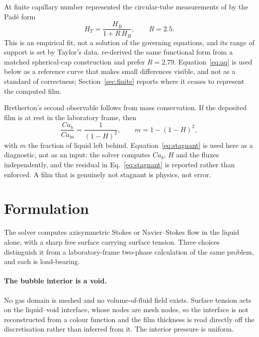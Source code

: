\documentclass[11pt,a4paper]{article}
\begin{document}
At finite capillary number \citet{aussillous2000quick} represented the
circular-tube measurements of \citet{taylor1961deposition} by the Pad\'e form
\begin{equation}
  H_T=\frac{H_B}{1+R\,H_B},\qquad R=2.5.
  \label{eq:aq}
\end{equation}
This is an empirical fit, not a solution of the governing equations, and its
range of support is set by Taylor's data. \citet{klaseboer2014extended}
re-derived the same functional form from a matched spherical-cap construction
and prefer $R=2.79$. Equation~\eqref{eq:aq} is used below as a reference curve
that makes small differences visible, and not as a standard of correctness;
Section~\ref{sec:finite} reports where it ceases to represent the computed film.

Bretherton's second observable follows from mass conservation. If the deposited
film is at rest in the laboratory frame, then
\begin{equation}
  \frac{Ca_b}{Ca_{\mathrm{in}}}=\frac{1}{(1-H)^2},
  \qquad m=1-(1-H)^2,
  \label{eq:stagnant}
\end{equation}
with $m$ the fraction of liquid left behind. Equation~\eqref{eq:stagnant} is
used here as a diagnostic, not as an input: the solver computes $Ca_b$, $H$ and
the fluxes independently, and the residual in Eq.~\eqref{eq:stagnant} is
reported rather than enforced. A film that is genuinely not stagnant is
physics, not error.

\section{Formulation}

The solver computes axisymmetric Stokes or Navier--Stokes flow in the liquid
alone, with a sharp free surface carrying surface tension. Three choices
distinguish it from a laboratory-frame two-phase calculation of the same
problem, and each is load-bearing.

\paragraph{The bubble interior is a void.} No gas domain is meshed and no
volume-of-fluid field exists. Surface tension acts on the liquid--void
interface, whose nodes are mesh nodes, so the interface is not reconstructed
from a colour function and the film thickness is read directly off the
discretisation rather than inferred from it. The interior pressure is uniform.
\end{document}
